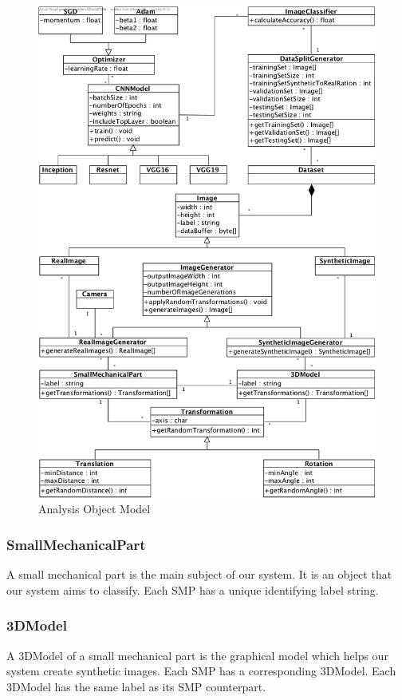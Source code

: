 \documentclass[a4paper,12pt,twoside]{report}
\begin{document}
\begin{figure}[h]
\centering
  \includegraphics[width=\textwidth]{AOM}
\caption{Analysis Object Model}
\label{fig:AOM}
\end{figure}

\subsubsection{SmallMechanicalPart}
A small mechanical part is the main subject of our system. It is an object that our system aims to classify. Each SMP has a unique identifying label string.

\subsubsection{3DModel}
A 3DModel of a small mechanical part is the graphical model which helps our system create synthetic images. Each SMP has a corresponding 3DModel. Each 3DModel has the same label as its SMP counterpart.
\end{document}
